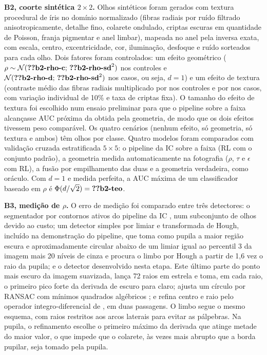 \textbf{B2, coorte sintética $2\times2$.} Olhos sintéticos foram gerados com
textura procedural de íris no domínio normalizado (fibras radiais por ruído
filtrado anisotropicamente, detalhe fino, colarete ondulado, criptas escuras
em quantidade de Poisson, franja pigmentar e anel limbar), mapeada no anel
pela inversa exata, com escala, centro, excentricidade, cor, iluminação,
desfoque e ruído sorteados para cada olho. Dois fatores foram controlados: um
efeito geométrico ($\rho\sim\mathcal{N}(\val{b2-rho-c};\,\val{b2-rho-sd}^2)$
nos controles e $\mathcal{N}(\val{b2-rho-d};\,\val{b2-rho-sd}^2)$ nos casos,
ou seja, $d=1$) e um efeito de textura (contraste médio das fibras radiais
multiplicado por  nos controles e por  nos
casos, com variação individual de 10\% e taxa de criptas fixa). O tamanho do
efeito de textura foi escolhido num ensaio preliminar para que o pipeline
sobre a faixa alcançasse AUC próxima da obtida pela geometria, de modo que os
dois efeitos tivessem peso comparável. Os quatro cenários (nenhum
efeito, só geometria, só textura e ambos) têm  olhos por classe.
Quatro modelos foram comparados com validação cruzada estratificada
$5\times5$: o pipeline da IC sobre a faixa (RL com o conjunto padrão), a
geometria medida automaticamente na fotografia ($\rho$, $\tau$ e $\epsilon$
com RL), a fusão por empilhamento das duas \citep*{Wolpert1992} e a geometria
verdadeira, como oráculo. Com $d=1$ e medida perfeita, a AUC máxima de um
classificador baseado em $\rho$ é $\Phi(d/\sqrt2)=\val{b2-teo}$.

\textbf{B3, medição de $\rho$.} O erro de medição foi comparado entre três
detectores: o segmentador por contornos ativos do pipeline da IC
\citep*{Kass1988}, num subconjunto de  olhos devido ao custo; um
detector simples por limiar e transformada de Hough, incluído na
demonstração do pipeline, que toma como pupila a maior região escura e
aproximadamente circular abaixo de um limiar igual ao percentil 3 da imagem
mais 20 níveis de cinza e procura o limbo por Hough a partir de 1,6 vez o
raio da pupila; e o detector desenvolvido nesta etapa. Este último parte do ponto
mais escuro da imagem suavizada, lança 72 raios em estrela
\citep*{Li2005} e toma, em cada raio, o primeiro pico forte da derivada de
escuro para claro; ajusta um círculo por RANSAC \citep*{FischlerBolles1981}
com mínimos quadrados algébricos \citep*{Kasa1976}; e refina centro e raio
pelo operador integro-diferencial de \citet{Daugman1993}, em duas passagens.
O limbo segue o mesmo esquema, com raios restritos aos arcos laterais para
evitar as pálpebras. Na pupila, o refinamento escolhe o primeiro máximo da
derivada que atinge metade do maior valor, o que impede que o colarete, às
vezes mais abrupto que a borda pupilar, seja tomado pela pupila.

